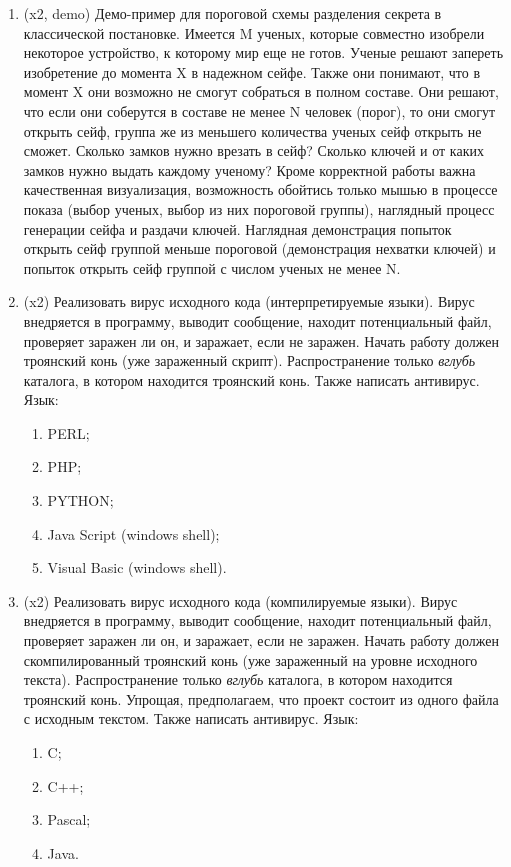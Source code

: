 \documentclass[a4paper]{article}
\begin{document}
\begin{enumerate}
\item (x2, demo) Демо-пример для пороговой схемы разделения секрета в классической постановке. Имеется M ученых, которые совместно изобрели некоторое устройство, к которому мир еще не готов. Ученые решают запереть изобретение до момента X в надежном сейфе. Также они понимают, что в момент X они возможно не смогут собраться в полном составе. Они решают, что если они соберутся в составе не менее N человек (порог), то они смогут открыть сейф, группа же из меньшего количества ученых сейф открыть не сможет. Сколько замков нужно врезать в сейф? Сколько ключей и от каких замков нужно выдать каждому ученому? Кроме корректной работы важна качественная визуализация, возможность обойтись только мышью в процессе показа (выбор ученых, выбор из них пороговой группы), наглядный процесс генерации сейфа и раздачи ключей. Наглядная демонстрация попыток открыть сейф группой меньше пороговой (демонстрация нехватки ключей) и попыток открыть сейф группой с числом ученых не менее N.


\item (x2) Реализовать вирус исходного кода (интерпретируемые языки). Вирус внедряется в программу, выводит сообщение, находит потенциальный файл, проверяет заражен ли он, и заражает, если не заражен. Начать работу должен троянский конь (уже зараженный скрипт). Распространение только \emph{вглубь} каталога, в котором находится троянский конь. Также написать антивирус. Язык:
\begin{enumerate}
    \item PERL;
    \item PHP;
    \item PYTHON;
    \item Java Script (windows shell);
    \item Visual Basic (windows shell).
\end{enumerate}


\item (x2) Реализовать вирус исходного кода (компилируемые языки). Вирус внедряется в программу, выводит сообщение, находит потенциальный файл, проверяет заражен ли он, и заражает, если не заражен. Начать работу должен скомпилированный троянский конь (уже зараженный на уровне исходного текста). Распространение только \emph{вглубь} каталога, в котором находится троянский конь. Упрощая, предполагаем, что проект состоит из одного файла с исходным текстом. Также написать антивирус. Язык:
\begin{enumerate}
    \item C;
    \item C++;
    \item Pascal;
    \item Java.
\end{enumerate}


\end{enumerate}
\end{document}
